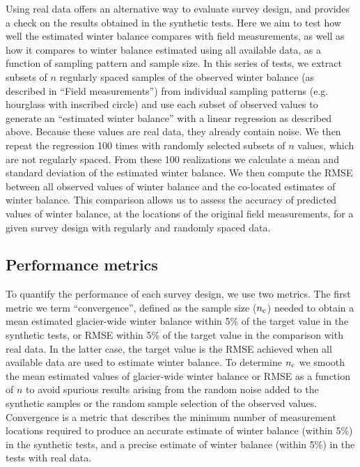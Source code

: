 \documentclass[twocolumn,letterpaper]{igs}
\begin{document}
 Using real data offers an alternative way to evaluate survey design, and provides a check on the results obtained in the synthetic tests. 
Here we aim to test how well the estimated winter balance compares with field measurements, as well as how it compares to winter balance estimated using all available data, as a function of sampling pattern and sample size. 
In this series of tests, we extract subsets of $n$ regularly spaced samples of the observed winter balance (as described in ``Field measurements'') from individual sampling patterns (e.g. hourglass with inscribed circle) and use each subset of observed values to generate an ``estimated winter balance'' with a linear regression as described above. Because these values are real data, they already contain noise. 
We then repeat the regression 100 times with randomly selected subsets of $n$ values, which are not regularly spaced. From these 100 realizations we calculate a mean and standard deviation of the estimated winter balance. We then compute the RMSE between all observed values of winter balance and the co-located estimates of winter balance. This comparison allows us to assess the accuracy of predicted values of winter balance, at the locations of the original field measurements, for a given survey design with regularly and randomly spaced data. 


 \subsection{Performance metrics}
 
To quantify the performance of each survey design, we use two metrics. The first metric we term ``convergence'', defined as the sample size ($n_{\rm c}$) needed to obtain a mean estimated glacier-wide winter balance within 5\% of the target value in the synthetic tests, or RMSE within 5\% of the target value in the comparison with real data. In the latter case, the target value is the RMSE achieved when all available data are used to estimate winter balance.
To determine $n_{\rm c}$ we smooth the mean estimated values of glacier-wide winter balance or RMSE as a function of $n$ to avoid spurious results arising from the random noise added to the synthetic samples or the random sample selection of the observed values.
Convergence is a metric that describes the minimum number of measurement locations required to produce an accurate estimate of winter balance (within 5\%) in the synthetic tests, and a precise estimate of winter balance (within 5\%) in the tests with real data. 
\end{document}
